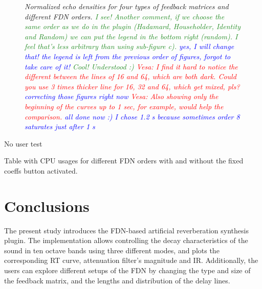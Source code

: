 \documentclass[twoside,a4paper]{article}
\newcommand{\silvin}[1]{\textcolor{ForestGreen}{#1}}
\newcommand{\karolina}[1]{\textcolor{blue}{#1}}
\newcommand{\vesa}[1]{\textcolor{red}{Vesa: #1}}
\begin{document}
\begin{figure}[ht!]
     \hfill
    \caption{\textit{Normalized echo densities for four types of feedback matrices and different FDN orders. \silvin{I see! Another comment, if we choose the same order as we do in the plugin (Hadamard, Householder, Identity and Random) we can put the legend in the bottom right (random). I feel that's less arbitrary than using sub-figure c). \karolina{yes, I will change that! the legend is left from the previous order of figures, forgot to take care of it!} \silvin{Cool! Understood :)}}
    \vesa{I find it hard to notice the different between the lines of 16 and 64, which are both dark. Could you use 3 times thicker line for 16, 32 and 64, which get mixed, pls?} \karolina{correcting those figures right now}
    \vesa{Also showing only the beginning of the curves up to 1 sec, for example, would help the comparison.} \karolina{all done now :) I chose 1.2 s because sometimes order 8 saturates just after 1 s}
    }}
    \label{fig:echo}
\end{figure}

No user test

Table with CPU usages for different FDN orders with and without the fixed coeffs button activated.

\section{Conclusions}

The present study introduces the FDN-based artificial reverberation synthesis plugin. The implementation allows controlling the decay characteristics of the sound in ten octave bands using three different modes, and plots the corresponding RT curve, attenuation filter's magnitude and IR. %
Additionally, the users can explore different setups of the FDN by changing the type and size of the feedback matrix, and the lengths and distribution of the delay lines. 
\end{document}
